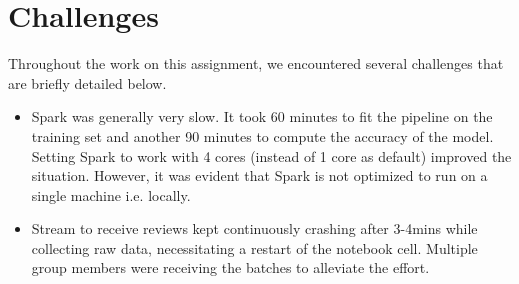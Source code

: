 \documentclass[11pt, oneside]{article}   	%
\begin{document}
	\section{Challenges}
	
	Throughout the work on this assignment, we encountered several challenges that are briefly detailed below.
	\begin{itemize}
		
		\item Spark was generally very slow. It took 60 minutes to fit the pipeline on the training set and another 90 minutes to compute the accuracy of the model. Setting Spark to work with 4 cores (instead of 1 core as default) improved the situation. However, it was evident that Spark is not optimized to run on a single machine i.e. locally.
		\item Stream to receive reviews kept continuously crashing after 3-4mins while collecting raw data, necessitating a restart of the notebook cell. Multiple group members were receiving the batches to alleviate the effort.
		
	\end{itemize}
	
\end{document}
